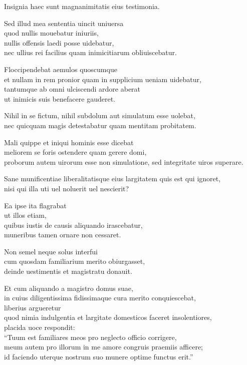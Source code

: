 \documentclass[a5paper,twoside]{article}
\begin{document}
Insignia haec sunt magnanimitatis eius testimonia. 

Sed illud mea sententia uincit uniuersa \\
quod nullis mouebatur iniuriis, \\
nullis offensis laedi posse uidebatur, \\
nec ullius rei facilius quam inimicitiarum obliuiscebatur. 

Floccipendebat aemulos quoscumque \\
et nullam in rem pronior quam in supplicium ueniam uidebatur, \\
tantumque ab omni ulciscendi ardore aberat \\
ut inimicis suis benefacere gauderet. 

Nihil in se fictum, nihil subdolum aut simulatum esse uolebat,\\
nec quicquam magis detestabatur quam mentitam probitatem. 

Mali quippe et iniqui hominis esse dicebat \\
meliorem se foris ostendere quam gerere domi, \\
proborum autem uirorum esse non simulatione, sed integritate uiros superare. 

Sane munificentiae liberalitatisque eius largitatem quis est qui ignoret, \\
nisi qui illa uti uel noluerit uel nescierit? 

Ea ipse ita flagrabat \\
ut illos etiam, \\
quibus iustis de causis aliquando irascebatur, \\
muneribus tamen ornare non cessaret. 

Non semel neque solus interfui \\
cum quosdam familiarium merito obiurgasset, \\
deinde uestimentis et magistratu donauit. 

Et cum aliquando a magistro domus suae, \\
in cuius diligentissima fidissimaque cura merito conquiescebat, \\
liberius argueretur \\
quod nimia indulgentia et largitate domesticos faceret insolentiores, \\
placida uoce respondit: \\
``Tuum est familiares meos pro neglecto officio corrigere, \\
meum autem pro illorum in me amore congruis praemiis afficere; \\
id faciendo uterque nostrum suo munere optime functus erit.'' 
\end{document}
